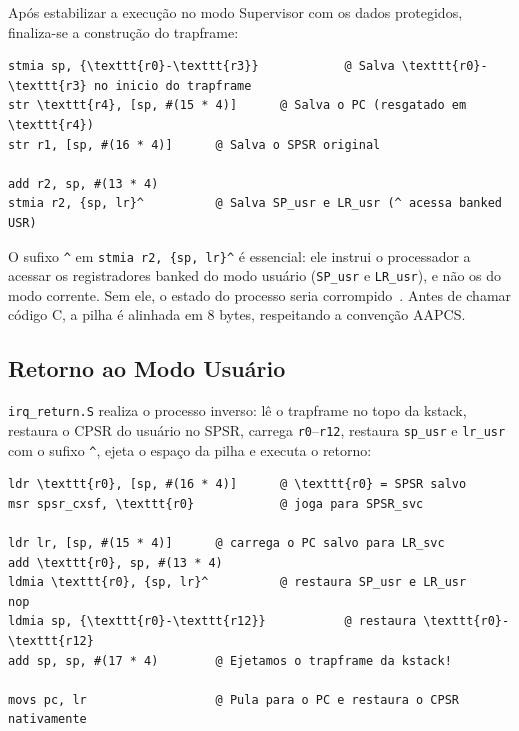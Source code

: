 Após estabilizar a execução no modo Supervisor com os dados protegidos, 
finaliza-se a construção do trapframe:

\lstset{captionpos=t}
\begin{lstlisting}[language={[x86masm]Assembler},
                   caption={Finalização do trapframe na pilha de kernel}]
stmia sp, {\texttt{r0}-\texttt{r3}}            @ Salva \texttt{r0}-\texttt{r3} no inicio do trapframe
str \texttt{r4}, [sp, #(15 * 4)]      @ Salva o PC (resgatado em \texttt{r4})
str r1, [sp, #(16 * 4)]      @ Salva o SPSR original

add r2, sp, #(13 * 4)
stmia r2, {sp, lr}^          @ Salva SP_usr e LR_usr (^ acessa banked USR)
\end{lstlisting}
\lstset{captionpos=b}

O sufixo \texttt{\^} em \texttt{stmia r2, \{sp, lr\}\^} é essencial: ele
instrui o processador a acessar os registradores banked do modo usuário
(\texttt{SP\_usr} e \texttt{LR\_usr}), e não os do modo corrente. Sem ele,
o estado do processo seria corrompido~\cite{arm:armv7ar}. Antes de chamar
código C, a pilha é alinhada em 8 bytes, respeitando a convenção AAPCS.

\subsection{Retorno ao Modo Usuário}

\texttt{irq\_return.S} realiza o processo inverso: lê o trapframe no topo da
kstack, restaura o CPSR do usuário no SPSR, carrega \texttt{r0}--\texttt{r12}, restaura
\texttt{sp\_usr} e \texttt{lr\_usr} com o sufixo \texttt{\^}, ejeta o 
espaço da pilha e executa o retorno:

\lstset{captionpos=t}
\begin{lstlisting}[language={[x86masm]Assembler},
                   caption={Retorno ao modo usuário em \texttt{irq\_return.S}}]
ldr \texttt{r0}, [sp, #(16 * 4)]      @ \texttt{r0} = SPSR salvo
msr spsr_cxsf, \texttt{r0}            @ joga para SPSR_svc

ldr lr, [sp, #(15 * 4)]      @ carrega o PC salvo para LR_svc
add \texttt{r0}, sp, #(13 * 4)
ldmia \texttt{r0}, {sp, lr}^          @ restaura SP_usr e LR_usr
nop                              
ldmia sp, {\texttt{r0}-\texttt{r12}}           @ restaura \texttt{r0}-\texttt{r12}
add sp, sp, #(17 * 4)        @ Ejetamos o trapframe da kstack!

movs pc, lr                  @ Pula para o PC e restaura o CPSR nativamente
\end{lstlisting}
\lstset{captionpos=b}

